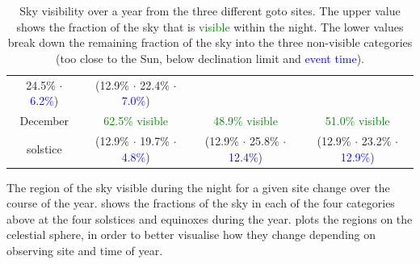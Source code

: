 \begin{colsection}
\begin{colsection}
\begin{table}[t]
\begin{center}
\begin{tabular}{c|ccc}
{                         \textcolor{NavyBlue}{24.5\%} $\cdot$
                         \textcolor{Blue}{6.2\%})}
          & {\scriptsize(\textcolor{BurntOrange}{12.9\%} $\cdot$
                         \textcolor{NavyBlue}{22.4\%} $\cdot$
                         \textcolor{Blue}{7.0\%})}
          \\[0.5cm]
December  & \textcolor{Green}{62.5\% visible}
          & \textcolor{Green}{48.9\% visible}
          & \textcolor{Green}{51.0\% visible}
          \\
solstice  & {\scriptsize(\textcolor{BurntOrange}{12.9\%} $\cdot$
                         \textcolor{NavyBlue}{19.7\%} $\cdot$
                         \textcolor{Blue}{4.8\%})}
          & {\scriptsize(\textcolor{BurntOrange}{12.9\%} $\cdot$
                         \textcolor{NavyBlue}{25.8\%} $\cdot$
                         \textcolor{Blue}{12.4\%})}
          & {\scriptsize(\textcolor{BurntOrange}{12.9\%} $\cdot$
                         \textcolor{NavyBlue}{23.2\%} $\cdot$
                         \textcolor{Blue}{12.9\%})}
          \\

\end{tabular}
\end{center}
\caption[Sky visibility over a year]{Sky visibility over a year from the three different \gls{goto} sites. The upper value shows the fraction of the sky that is \textcolor{Green}{visible} within the night. The lower values break down the remaining fraction of the sky into the three non-visible categories (\textcolor{BurntOrange}{too close to the Sun}, \textcolor{NavyBlue}{below declination limit} and \textcolor{Blue}{event time}).}
\label{tab:visibility}
\end{table}

The region of the sky visible during the night for a given site change over the course of the year.  shows the fractions of the sky in each of the four categories above at the four solstices and equinoxes during the year.  plots the regions on the celestial sphere, in order to better visualise how they change depending on observing site and time of year.

\begin{figure}[p]


\end{figure}
\end{colsection}
\end{colsection}
